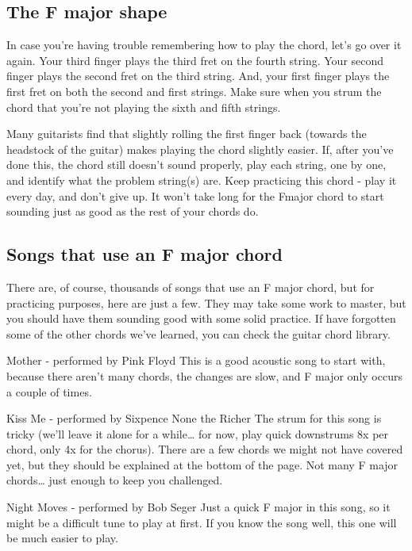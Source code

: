 \subsection{The F major shape}

In case you're having trouble remembering how to play the chord, let's go over
it again. Your third finger plays the third fret on the fourth string. Your
second finger plays the second fret on the third string. And, your first finger
plays the first fret on both the second and first strings. Make sure when you
strum the chord that you're not playing the sixth and fifth strings.

Many guitarists find that slightly rolling the first finger back (towards the
headstock of the guitar) makes playing the chord slightly easier. If, after
you've done this, the chord still doesn't sound properly, play each string, one
by one, and identify what the problem string(s) are. Keep practicing this chord
- play it every day, and don't give up. It won't take long for the Fmajor chord
to start sounding just as good as the rest of your chords do.

\subsection{Songs that use an F major chord}

There are, of course, thousands of songs that use an F major chord, but for
practicing purposes, here are just a few. They may take some work to master,
but you should have them sounding good with some solid practice. If have
forgotten some of the other chords we've learned, you can check the guitar
chord library.

Mother - performed by Pink Floyd
This is a good acoustic song to start with, because there aren't many chords,
the changes are slow, and F major only occurs a couple of times.

Kiss Me - performed by Sixpence None the Richer
The strum for this song is tricky (we'll leave it alone for a while\ldots{} for now,
play quick downstrums 8x per chord, only 4x for the chorus). There are a few
chords we might not have covered yet, but they should be explained at the
bottom of the page. Not many F major chords\ldots{} just enough to keep you
challenged.

Night Moves - performed by Bob Seger
Just a quick F major in this song, so it might be a difficult tune to play at
first. If you know the song well, this one will be much easier to play. 

